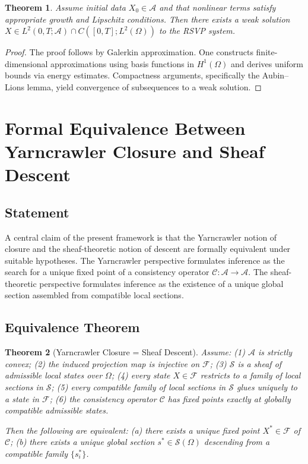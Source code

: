 \documentclass[12pt, oneside]{article}
\newtheorem{theorem}{Theorem}
\begin{document}
\begin{theorem}
Assume initial data $X_0 \in \mathcal{A}$ and that nonlinear terms satisfy appropriate growth and Lipschitz conditions. Then there exists a weak solution
$X \in L^2(0,T; \mathcal{A}) \cap C([0,T]; L^2(\Omega))$
to the RSVP system.
\end{theorem}

\begin{proof}
The proof follows by Galerkin approximation. One constructs finite-dimensional approximations using basis functions in $H^1(\Omega)$ and derives uniform bounds via energy estimates. Compactness arguments, specifically the Aubin--Lions lemma, yield convergence of subsequences to a weak solution.
\end{proof}

\section{Formal Equivalence Between Yarncrawler Closure and Sheaf Descent}

\subsection{Statement}

A central claim of the present framework is that the Yarncrawler notion of closure and the sheaf-theoretic notion of descent are formally equivalent under suitable hypotheses. The Yarncrawler perspective formulates inference as the search for a unique fixed point of a consistency operator $\mathcal{C} : \mathcal{A} \to \mathcal{A}$. The sheaf-theoretic perspective formulates inference as the existence of a unique global section assembled from compatible local sections.

\subsection{Equivalence Theorem}

\begin{theorem}[Yarncrawler Closure = Sheaf Descent]
Assume: (1) $\mathcal{A}$ is strictly convex; (2) the induced projection map is injective on $\mathcal{F}$; (3) $\mathcal{S}$ is a sheaf of admissible local states over $\Omega$; (4) every state $X \in \mathcal{F}$ restricts to a family of local sections in $\mathcal{S}$; (5) every compatible family of local sections in $\mathcal{S}$ glues uniquely to a state in $\mathcal{F}$; (6) the consistency operator $\mathcal{C}$ has fixed points exactly at globally compatible admissible states.

Then the following are equivalent: (a) there exists a unique fixed point $X^\ast \in \mathcal{F}$ of $\mathcal{C}$; (b) there exists a unique global section $s^\ast \in \mathcal{S}(\Omega)$ descending from a compatible family $\{s_i^\ast\}$.
\end{theorem}
\end{document}
